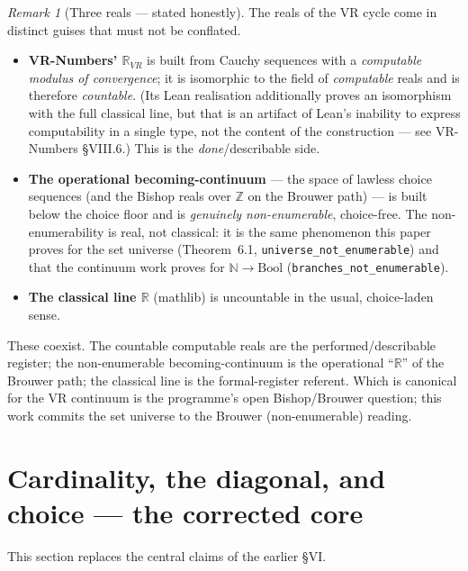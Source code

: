 \documentclass[11pt]{article}
\theoremstyle{remark}
\newtheorem{rem}[thm]{Remark}
\newcommand{\N}{\mathbb{N}}
\newcommand{\R}{\mathbb{R}}
\newcommand{\Z}{\mathbb{Z}}
\begin{document}
\begin{rem}[Three reals --- stated honestly]
The reals of the VR cycle come in distinct guises that must not be conflated.
\begin{itemize}
\item \textbf{VR-Numbers' $\R_{VR}$} is built from Cauchy sequences with a \emph{computable modulus
of convergence}; it is isomorphic to the field of \emph{computable} reals and is therefore
\emph{countable}. (Its Lean realisation additionally proves an isomorphism with the full classical
line, but that is an artifact of Lean's inability to express computability in a single type, not the
content of the construction --- see VR-Numbers \S VIII.6.) This is the \emph{done}/describable side.
\item \textbf{The operational becoming-continuum} --- the space of lawless choice sequences (and the
Bishop reals over $\Z$ on the Brouwer path) --- is built below the choice floor and is
\emph{genuinely non-enumerable}, choice-free. The non-enumerability is real, not classical: it is the
same phenomenon this paper proves for the set universe (Theorem~6.1, \texttt{universe\_not\_enumerable})
and that the continuum work proves for $\N\to\mathrm{Bool}$ (\texttt{branches\_not\_enumerable}).
\item \textbf{The classical line $\R$} (mathlib) is uncountable in the usual, choice-laden sense.
\end{itemize}
These coexist. The countable computable reals are the performed/describable register; the
non-enumerable becoming-continuum is the operational ``$\R$'' of the Brouwer path; the classical
line is the formal-register referent. Which is canonical for the VR continuum is the programme's open
Bishop/Brouwer question; this work commits the set universe to the Brouwer (non-enumerable) reading.
\end{rem}

\section{Cardinality, the diagonal, and choice --- the corrected core}
This section replaces the central claims of the earlier \S VI.
\end{document}
